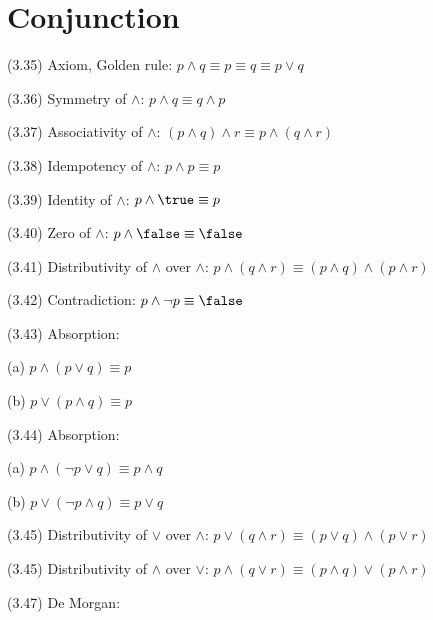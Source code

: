 \documentclass[a4paper,10pt]{article}
\newenvironment{theoremlist}{
\begin{description}
  \setlength{\itemsep}{1.5pt}
  \setlength{\parskip}{0pt}
  \setlength{\parsep}{0pt}
}{\end{description}}
\begin{document}
\section{Conjunction}

\begin{theoremlist}
\item[(3.35) Axiom, Golden rule:]						$ p \land q \equiv p \equiv q \equiv p \lor q $
\item[(3.36) Symmetry of $\land$:]						$ p \land q \equiv q \land p $
\item[(3.37) Associativity of $\land$:]						$ (p \land q) \land r \equiv p \land (q \land r) $
\item[(3.38) Idempotency of $\land$:]						$ p \land p \equiv p $
\item[(3.39) Identity of $\land$:]						$ p \land \true \equiv p $
\item[(3.40) Zero of $\land$:]							$ p \land \false \equiv \false  $
\item[(3.41) Distributivity of $\land$ over $\land$:]				$ p \land (q \land r) \equiv (p \land q) \land (p \land r) $
\item[(3.42) Contradiction:]							$ p \land \lnot p \equiv \false $
\item[(3.43) Absorption:]						
  \begin{theoremlist}
  \item %
  \item[(a)]									$ p \land (p \lor q) \equiv p $
  \item[(b)] 									$ p \lor (p \land q) \equiv p $
  \end{theoremlist}                  						                               	              
\item[(3.44) Absorption:]
  \begin{theoremlist}
  \item %
  \item[(a)]									$ p \land (\lnot p \lor q) \equiv p \land q $
  \item[(b)] 									$ p \lor (\lnot p \land q) \equiv p \lor q $
  \end{theoremlist}      
\item[(3.45) Distributivity of $\lor$ over $\land$:]				$ p \lor (q \land r) \equiv (p \lor q) \land (p \lor r) $
\item[(3.45) Distributivity of $\land$ over $\lor$:]				$ p \land (q \lor r) \equiv (p \land q) \lor (p \land r) $
\item[(3.47) De Morgan:]

\end{theoremlist}
\end{document}
